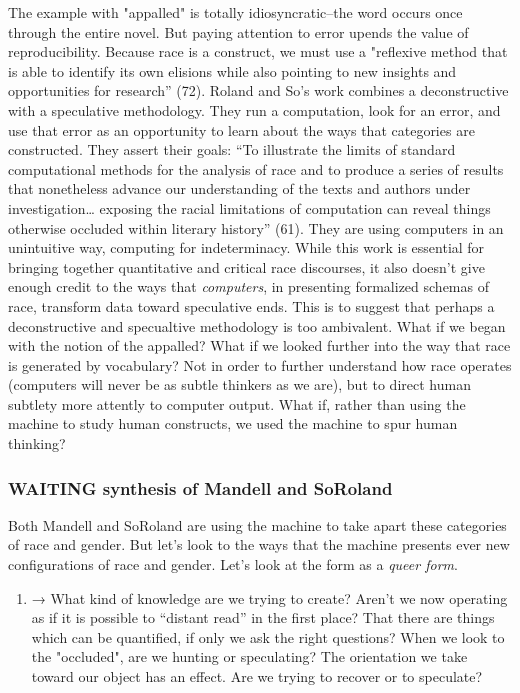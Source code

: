 \documentclass[11pt]{article}
\begin{document}
The example with "appalled" is totally idiosyncratic--the word occurs
once through the entire novel. But paying attention to error upends
the value of reproducibility. Because race is a construct, we must use
a "reflexive method that is able to identify its own elisions while
also pointing to new insights and opportunities for research”
(72). Roland and So's work combines a deconstructive with a
speculative methodology. They run a computation, look for an error,
and use that error as an opportunity to learn about the ways that
categories are constructed. They assert their goals: “To illustrate
the limits of standard computational methods for the analysis of race
and to produce a series of results that nonetheless advance our
understanding of the texts and authors under investigation… exposing
the racial limitations of computation can reveal things otherwise
occluded within literary history” (61). They are using computers in an
unintuitive way, computing for indeterminacy. While this work is
essential for bringing together quantitative and critical race
discourses, it also doesn't give enough credit to the ways that
\emph{computers}, in presenting formalized schemas of race, transform data
toward speculative ends. This is to suggest that perhaps a
deconstructive and specualtive methodology is too ambivalent. What if
we began with the notion of the appalled?  What if we looked further
into the way that race is generated by vocabulary?  Not in order to
further understand how race operates (computers will never be as
subtle thinkers as we are), but to direct human subtlety more attently
to computer output. What if, rather than using the machine to study
human constructs, we used the machine to spur human thinking?

\subsubsection{{\bfseries\sffamily WAITING} synthesis of Mandell and SoRoland}
\label{sec:orgace0e1d}
Both Mandell and SoRoland are using the machine to take apart these
categories of race and gender.
But let's look to the ways that the machine presents ever new
configurations of race and gender. Let's look at the form as a \emph{queer
form}. 
\begin{enumerate}
\item → What kind of knowledge are we trying to create? Aren't we now
\label{sec:org330045f}
operating as if it is possible to “distant read” in the first
place? That there are things which can be quantified, if only we
ask the right questions? When we look to the "occluded", are we
hunting or speculating?  The orientation we take toward our object
has an effect. Are we trying to recover or to speculate?
\end{enumerate}
\end{document}
